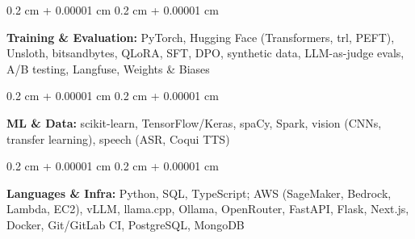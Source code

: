 \documentclass[10.5pt, letterpaper]{article}
\newenvironment{onecolentry}{
    \begin{adjustwidth}{
        0.2 cm + 0.00001 cm
    }{
        0.2 cm + 0.00001 cm
    }
}{
    \end{adjustwidth}
} %
\begin{document}
\vspace{0.05cm}
\begin{onecolentry}
\textbf{Training \& Evaluation:} PyTorch, Hugging Face (Transformers, trl, PEFT), Unsloth, bitsandbytes, QLoRA, SFT, DPO, synthetic data, LLM-as-judge evals, A/B testing, Langfuse, Weights \& Biases
\end{onecolentry}

\vspace{0.05cm}
\begin{onecolentry}
\textbf{ML \& Data:} scikit-learn, TensorFlow/Keras, spaCy, Spark, vision (CNNs, transfer learning), speech (ASR, Coqui TTS)
\end{onecolentry}

\vspace{0.05cm}
\begin{onecolentry}
\textbf{Languages \& Infra:} Python, SQL, TypeScript; AWS (SageMaker, Bedrock, Lambda, EC2), vLLM, llama.cpp, Ollama, OpenRouter, FastAPI, Flask, Next.js, Docker, Git/GitLab CI, PostgreSQL, MongoDB
\end{onecolentry}
\end{document}
